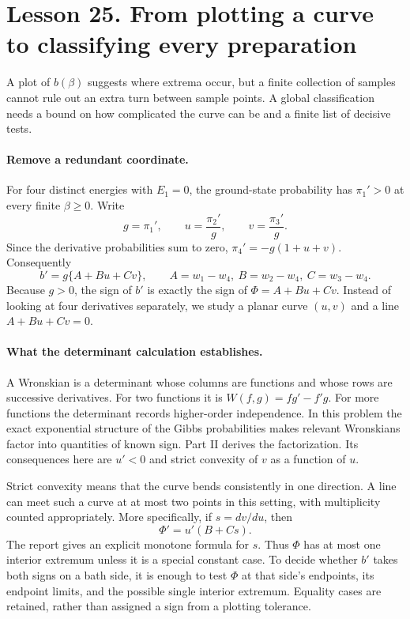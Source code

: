 \documentclass[11pt]{article}
\begin{document}
\clearpage
\section*{Lesson 25. From plotting a curve to classifying every preparation}
A plot of $b(\beta)$ suggests where extrema occur, but a finite collection
of samples cannot rule out an extra turn between sample points. A global
classification needs a bound on how complicated the curve can be and a
finite list of decisive tests.

\paragraph{Remove a redundant coordinate.}
For four distinct energies with $E_1=0$, the ground-state probability has
$\pi_1'>0$ at every finite $\beta\geq0$. Write
\[
g=\pi_1',\qquad u=\frac{\pi_2'}g,\qquad
v=\frac{\pi_3'}g.
\]
Since the derivative probabilities sum to zero,
$\pi_4'=-g(1+u+v)$. Consequently
\[
b'=g\{A+Bu+Cv\},\qquad
A=w_1-w_4,\ B=w_2-w_4,\ C=w_3-w_4.
\]
Because $g>0$, the sign of $b'$ is exactly the sign of
$\Phi=A+Bu+Cv$. Instead of looking at four derivatives separately, we
study a planar curve $(u,v)$ and a line $A+Bu+Cv=0$.

\paragraph{What the determinant calculation establishes.}
A Wronskian is a determinant whose columns are functions and whose rows
are successive derivatives. For two functions it is
$W(f,g)=fg'-f'g$. For more functions the determinant records higher-order
independence. In this problem the exact exponential structure of the
Gibbs probabilities makes relevant Wronskians factor into quantities of
known sign. Part II derives the factorization. Its consequences here are
$u'<0$ and strict convexity of $v$ as a function of $u$.

Strict convexity means that the curve bends consistently in one direction.
A line can meet such a curve at at most two points in this setting, with
multiplicity counted appropriately. More specifically, if
$s=dv/du$, then
\[
\Phi'=u'(B+Cs).
\]
The report gives an explicit monotone formula for $s$. Thus $\Phi$ has at
most one interior extremum unless it is a special constant case. To decide
whether $b'$ takes both signs on a bath side, it is enough to test $\Phi$
at that side's endpoints, its endpoint limits, and the possible single
interior extremum. Equality cases are retained, rather than assigned a
sign from a plotting tolerance.
\end{document}
